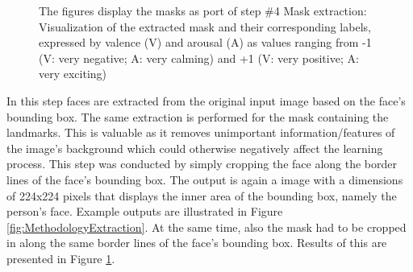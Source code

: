 \begin{figure}[htbp]
  \hfill
  \caption[ER pipeline step \#4: Mask extraction]{The figures display the masks as port of step \#4 Mask extraction: Visualization of the extracted mask and their corresponding labels, expressed by valence (V) and arousal (A) as values ranging from -1 (V: very negative; A: very calming) and +1 (V: very positive; A: very exciting)}
  \label{fig:MethodologyExtractionMask}
\end{figure}

\noindent In this step faces are extracted from the original input image based on the face's bounding box. The same extraction is performed for the mask containing the landmarks. This is valuable as it removes unimportant information/features of the image's background which could otherwise negatively affect the learning process.
\newline\newline
This step was conducted by simply cropping the face along the border lines of the face's bounding box. The output is again a image with a dimensions of 224x224 pixels that displays the inner area of the bounding box, namely the person's face. Example outputs are illustrated in Figure \ref{fig:MethodologyExtraction}. At the same time, also the mask had to be cropped in along the same border lines of the face's bounding box. Results of this are presented in Figure \ref{fig:MethodologyExtractionMask}.



